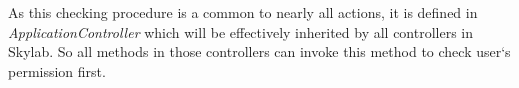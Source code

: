 
As this checking procedure is a common to nearly all actions, it is defined in \textit{ApplicationController} which will be effectively inherited by all controllers in Skylab. So all methods in those controllers can invoke this method to check user`s permission first.

